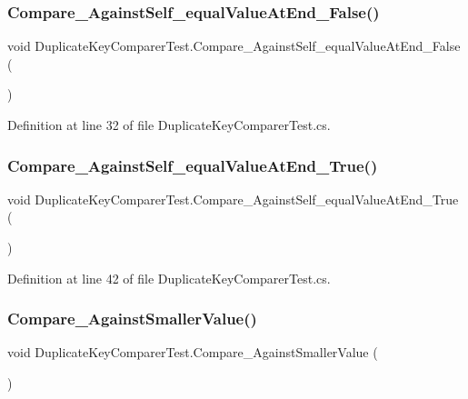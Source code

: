 \subsubsection{\texorpdfstring{Compare\+\_\+\+Against\+Self\+\_\+equal\+Value\+At\+End\+\_\+\+False()}{Compare\_AgainstSelf\_equalValueAtEnd\_False()}}
{\footnotesize\ttfamily void Duplicate\+Key\+Comparer\+Test.\+Compare\+\_\+\+Against\+Self\+\_\+equal\+Value\+At\+End\+\_\+\+False (\begin{DoxyParamCaption}{ }\end{DoxyParamCaption})}



Definition at line 32 of file Duplicate\+Key\+Comparer\+Test.\+cs.

\mbox{\label{class_duplicate_key_comparer_test_aa94101e4b66e2d8dc65a7c51e5a23bc0}} 
\subsubsection{\texorpdfstring{Compare\+\_\+\+Against\+Self\+\_\+equal\+Value\+At\+End\+\_\+\+True()}{Compare\_AgainstSelf\_equalValueAtEnd\_True()}}
{\footnotesize\ttfamily void Duplicate\+Key\+Comparer\+Test.\+Compare\+\_\+\+Against\+Self\+\_\+equal\+Value\+At\+End\+\_\+\+True (\begin{DoxyParamCaption}{ }\end{DoxyParamCaption})}



Definition at line 42 of file Duplicate\+Key\+Comparer\+Test.\+cs.

\mbox{\label{class_duplicate_key_comparer_test_a489c0312d2a89811bf2ed17c2719919a}} 
\subsubsection{\texorpdfstring{Compare\+\_\+\+Against\+Smaller\+Value()}{Compare\_AgainstSmallerValue()}}
{\footnotesize\ttfamily void Duplicate\+Key\+Comparer\+Test.\+Compare\+\_\+\+Against\+Smaller\+Value (\begin{DoxyParamCaption}{ }\end{DoxyParamCaption})}



